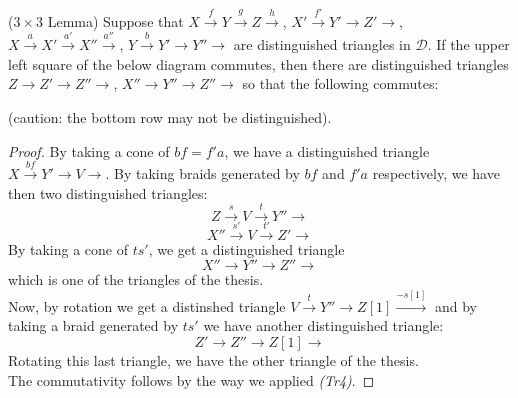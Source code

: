\begin{prop}\label{s}
\textnormal{($3 \times 3$ Lemma)} Suppose that $X \overset{f}{\longrightarrow} Y \overset{g}{\longrightarrow} Z \overset{h}{\longrightarrow}$, $X' \overset{f'}{\longrightarrow} Y' \longrightarrow Z' \longrightarrow $, $X \overset{a}{\longrightarrow} X' \overset{a'}{\longrightarrow} X'' \overset{a''}{\longrightarrow} $, $Y \overset{b}{\longrightarrow} Y' \longrightarrow Y'' \longrightarrow $ are distinguished triangles in $\mathscr{D}$. If the upper left square of the below diagram commutes, then there are distinguished triangles $Z \longrightarrow Z' \longrightarrow Z'' \longrightarrow $, $X'' \longrightarrow Y'' \longrightarrow Z'' \longrightarrow $ so that the following commutes:  
\begin{center}
\end{center}
(caution: the bottom row may not be distinguished).
\end{prop}

\begin{proof}
By taking a cone of $bf=f'a$, we have a distinguished triangle $X \overset{bf}{\longrightarrow} Y' \longrightarrow V \longrightarrow $. By taking braids generated by $bf$ and $f'a$ respectively, we have then two distinguished triangles: $$Z \overset{s}{\longrightarrow} V \overset{t}{\longrightarrow} Y'' \longrightarrow$$   $$X'' \overset{s'}{\longrightarrow} V \overset{t'}{\longrightarrow} Z' \longrightarrow$$ 
By taking a cone of $ts'$, we get a distinguished triangle  $$X'' \longrightarrow Y'' \longrightarrow Z'' \longrightarrow$$ 
which is one of the triangles of the thesis. \\
Now, by rotation we get a distinshed triangle $V \overset{t}{\longrightarrow} Y'' \longrightarrow Z[1] \overset{-s[1]}{\longrightarrow}$ and by taking a braid generated by $ts'$ we have another distinguished triangle: 
$$Z' \longrightarrow Z'' \longrightarrow Z[1] \longrightarrow $$
Rotating this last triangle, we have the other triangle of the thesis. \\
The commutativity follows by the way we applied \textit{(Tr4)}. 
\end{proof}

